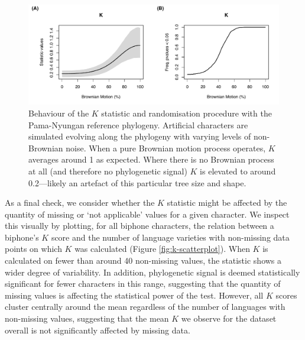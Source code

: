 \begin{figure}[tbp]

{\centering \includegraphics[width=0.9\linewidth]{05-phylo-signal/fig/phylosim} 

}

\caption[Behaviour of the $K$ statistic and randomisation procedure with the Pama-Nyungan reference phylogeny]{Behaviour of the $K$ statistic and randomisation procedure with the Pama-Nyungan reference phylogeny. Artificial characters are simulated evolving along the phylogeny with varying levels of non-Brownian noise. When a pure Brownian motion process operates, $K$ averages around 1 as expected. Where there is no Brownian process at all (and therefore no phylogenetic signal) $K$ is elevated to around 0.2---likely an artefact of this particular tree size and shape.}\label{fig:k-simulation-plots}
\end{figure}

As a final check, we consider whether the \(K\) statistic might be affected by the quantity of missing or `not applicable' values for a given character. We inspect this visually by plotting, for all biphone characters, the relation between a biphone's \(K\) score and the number of language varieties with non-missing data points on which \(K\) was calculated (Figure \ref{fig:k-scatterplot}). When \(K\) is calculated on fewer than around 40 non-missing values, the statistic shows a wider degree of variability. In addition, phylogenetic signal is deemed statistically significant for fewer characters in this range, suggesting that the quantity of missing values is affecting the statistical power of the test. However, all \(K\) scores cluster centrally around the mean regardless of the number of languages with non-missing values, suggesting that the mean \(K\) we observe for the dataset overall is not significantly affected by missing data.

